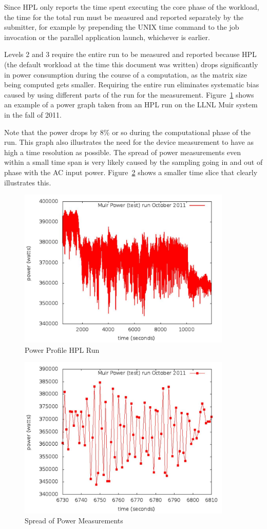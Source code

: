 \noindent
Since HPL only reports the time spent executing the core phase of the workload, the time for the total run must be measured and reported separately by the submitter, for example by prepending the UNIX time command to the job invocation or the parallel application launch, whichever is earlier.
\wl

\noindent
Levels 2 and 3 require the entire run to be measured and reported because HPL (the default workload at the time this document was written) drops significantly in power consumption during the course of a computation, as the matrix size being computed gets smaller.
Requiring the entire run eliminates systematic bias caused by using different parts of the run for the measurement.
Figure~\ref{fig:powprof} shows an example of a power graph taken from an HPL run on the LLNL Muir system in the fall of 2011.
\wl

\noindent
Note that the power drops by 8\% or so during the computational phase of the run.
This graph also illustrates the need for the device measurement to have as high a time resolution as possible.
The spread of power measurements even within a small time span is very likely caused by the sampling going in and out of phase with the AC input power.
Figure~\ref{fig:sopm} shows a smaller time slice that clearly illustrates this.
\wl


\begin{figure}
\centering
\includegraphics[width=4in]{fig3-1}
\caption{Power Profile HPL Run}
\label{fig:powprof}
\end{figure}

\begin{figure}
\centering
\includegraphics[width=4in]{fig3-2}
\caption{Spread of Power Measurements}
\label{fig:sopm}
\end{figure}

